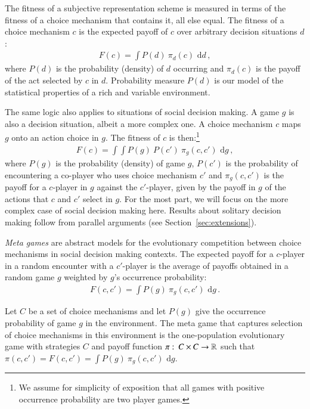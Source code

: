 \documentclass[fleqn,reqno,11pt]{article}
\begin{document}
The fitness of a subjective representation scheme is measured in terms of the fitness of a
choice mechanism that contains it, all else equal. The fitness of a choice mechanism $c$ is the
expected payoff of $c$ over arbitrary decision situations $d$:
\begin{align}
  \label{eq:FittnessChoiceMechSolitary}
  F(c) = \int P(d) \  \pi_d(c) \text{ d} d \,,
\end{align}
where $P(d)$ is the probability (density) of $d$ occurring and $\pi_d(c)$ is the payoff of
the act selected by $c$ in $d$. Probability measure $P(d)$ is our model of the statistical
properties of a rich and variable environment.

The same logic also applies to situations of social decision making. A game $g$ is also a
decision situation, albeit a more complex one. A choice mechanism $c$ maps $g$ onto an action
choice in $g$. The fitness of $c$ is then:\footnote{We assume for simplicity of exposition that
  all games with positive occurrence probability are two player games.}
\begin{align}
  \label{eq:FittnessChoiceMechGame}
  F(c) = \int \int P(g) \  P(c') \  \pi_g(c,c') \text{ d} g \,,
\end{align}
where $P(g)$ is the probability (density) of game $g$, $P(c')$ is the probability of
encountering a co-player who uses choice mechanism $c'$ and $\pi_g(c,c')$ is the payoff for
a $c$-player in $g$ against the $c'$-player, given by the payoff in $g$ of the actions that $c$
and $c'$ select in $g$. For the most part, we will focus on the more complex case of social
decision making here. Results about solitary decision making follow from parallel arguments
(see Section~\ref{sec:extensions}).

\emph{Meta games} are abstract models for the evolutionary competition between choice
mechanisms in social decision making contexts. The expected payoff for a $c$-player in a random
encounter with a $c'$-player is the average of payoffs obtained in a random game $g$ weighted
by $g$'s occurrence probability:
\begin{align}
  \label{eq:FittnessChoiceMechGamePairwise}
  F(c, c') = \int P(g) \  \pi_g(c,c') \text{ d} g \,.
\end{align}

\begin{definition}
  \label{def:MetaGame}
  Let $C$ be a set of choice mechanisms and let $P(g)$ give the occurrence probability of game
  $g$ in the environment. The meta game that captures selection of choice mechanisms in this
  environment is the one-population evolutionary game with strategies $C$ and payoff function
  $\pi \thinspace \colon \thinspace C \times C \rightarrow \mathbb{R}$ such that
  $\pi(c,c') = F(c,c') = \int P(g) \  \pi_g(c,c') \text{ d} g$.
\end{definition}
\end{document}
